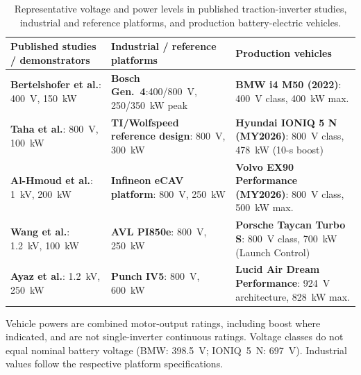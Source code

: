 \begin{table}[!t]
\caption{Representative voltage and power levels in published
traction-inverter studies, industrial and reference platforms, and
production battery-electric vehicles.}
\label{tab:intro_voltage_power}
\centering
\footnotesize
\renewcommand{\arraystretch}{1.18}
\setlength{\tabcolsep}{5.8pt}

\begin{tabular}{
p{}
p{}
p{}}
\hline

\multicolumn{1}{l}{\textbf{Published studies / demonstrators}} &
\multicolumn{1}{l}{\textbf{Industrial / reference platforms}} &
\multicolumn{1}{l}{\textbf{Production vehicles}} \\

\hline

\textbf{Bertelshofer et al.}:
400~V, 150~kW
\cite{Bertelshofer2019SiC150kW}
&
\textbf{Bosch Gen.~4}:400/800~V, 250/350~kW peak
\cite{BoschInverterGen4}
&
\textbf{BMW i4 M50 (2022)}:
400~V class, 400~kW max.
\cite{BMWi4M50Specifications}
\\

\textbf{Taha et al.}:
800~V, 100~kW
\cite{Taha2024SixPhase100kW}
&
\textbf{TI/Wolfspeed reference design}:
800~V, 300~kW
\cite{TIWolfspeed300kW}
&
\textbf{Hyundai IONIQ 5 N (MY2026)}:
800~V class, 478~kW (10-s boost)
\cite{HyundaiIoniq5N2026}
\\

\textbf{Al-Hmoud et al.}:
1~kV, 200~kW
\cite{AlHmoud2023Traction}
&
\textbf{Infineon eCAV platform}:
800~V, 250~kW
\cite{InfineonCAV250kW}
&
\textbf{Volvo EX90 Performance (MY2026)}:
800~V class, 500~kW max.
\cite{VolvoEX90Specifications2026}
\\

\textbf{Wang et al.}:
1.2~kV, 100~kW
\cite{Wang2021ANPC1200V}
&
\textbf{AVL PI850e}:
800~V, 250~kW
\cite{AVLPI850e}
&
\textbf{Porsche Taycan Turbo S}:
800~V class, 700~kW (Launch Control)
\cite{PorscheTaycanTurboS2026}
\\

\textbf{Ayaz et al.}:
1.2~kV, 250~kW
\cite{TwoLevel_Enes}
&
\textbf{Punch IV5}:
800~V, 600~kW
\cite{PunchIV5}
&
\textbf{Lucid Air Dream Performance}:
924~V architecture, 828~kW max.
\cite{LucidAirDreamPerformance}
\\

\hline
\end{tabular}
\par\smallskip
\parbox{0.96\textwidth}{\scriptsize Vehicle powers are combined motor-output ratings,
including boost where indicated, and are not single-inverter continuous ratings.
Voltage classes do not equal nominal battery voltage (BMW: 398.5~V;
IONIQ~5~N: 697~V). Industrial values follow the respective platform specifications.}
\end{table}

